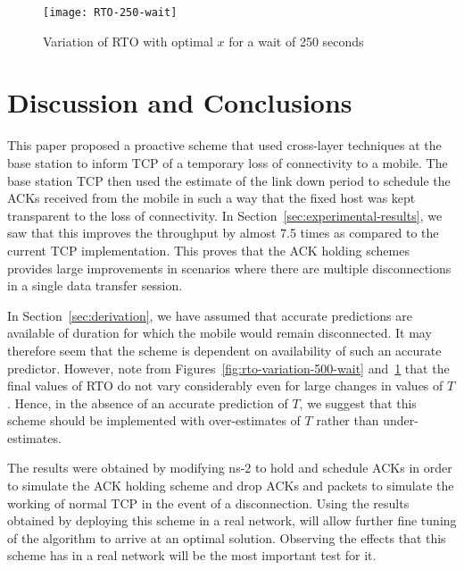 \documentclass[conference]{IEEEtran}
\begin{document}
\begin{figure}
  \centering
  \texttt{[image: RTO-250-wait]}
  \caption{Variation of RTO with optimal $x$ for a wait of 250 seconds}
  \label{fig:rto-variation-250-wait}
\end{figure}

\section{Discussion and Conclusions}
\label{sec:disc-concl}
This paper proposed a proactive scheme that used cross-layer techniques at the base station to inform TCP of a temporary loss of connectivity to a mobile. The base station TCP then used the estimate of the link down period to schedule the ACKs received from the mobile in such a way that the fixed host was kept transparent to the loss of connectivity. In Section~\ref{sec:experimental-results}, we saw that this improves the throughput by almost 7.5 times as compared to the current TCP implementation. This proves that the ACK holding schemes provides large improvements in scenarios where there are multiple disconnections in a single data transfer session. 



In Section~\ref{sec:derivation}, we have assumed that accurate predictions are available of duration for which the mobile would remain disconnected. It may therefore seem that the scheme is dependent on availability of such an accurate predictor. However, note from Figures~\ref{fig:rto-variation-500-wait} and~\ref{fig:rto-variation-250-wait} that the final values of RTO do not vary considerably even for large changes in values of $T$. Hence, in the absence of an accurate prediction of $T$, we suggest that this scheme should be implemented with over-estimates of $T$ rather than under-estimates.

The results were obtained by modifying ns-2 to hold and schedule ACKs in order to simulate the ACK holding scheme and drop ACKs and packets to simulate the working of normal TCP in the event of a disconnection. Using the results obtained by deploying this scheme in a real network, will allow further fine tuning of the algorithm to arrive at an optimal solution. Observing the effects that this scheme has in a real network will be the most important test for it. 



\end{document}
